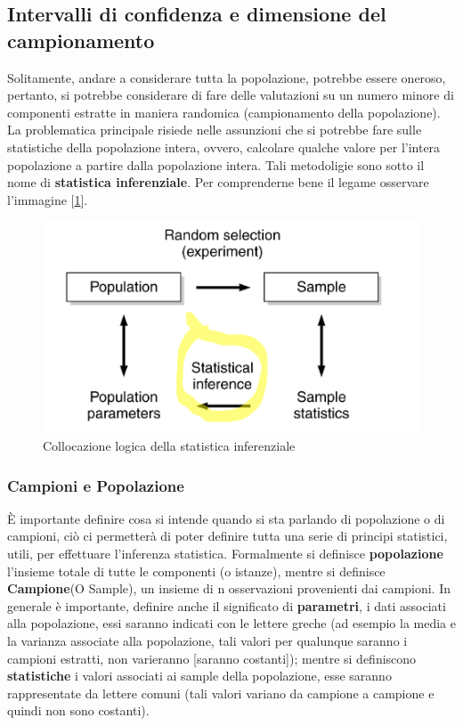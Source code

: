 \subsection{Intervalli di confidenza e dimensione del campionamento}
Solitamente, andare a considerare tutta la popolazione, potrebbe essere oneroso, pertanto, si potrebbe considerare di fare delle valutazioni su un numero minore di componenti estratte in maniera randomica (campionamento della popolazione). La problematica principale risiede nelle assunzioni che si potrebbe fare sulle statistiche della popolazione intera, ovvero, calcolare qualche valore per l'intera popolazione a partire dalla popolazione intera. Tali metodoligie sono sotto il nome di \textbf{statistica inferenziale}.
Per comprenderne bene il legame osservare l'immagine [\ref{img:statistica-inferenziale}].

\begin{figure}[h]
\centering
\includegraphics[width=.7\textwidth]{img/chapter-4/statistical-inference.png}
\caption{Collocazione logica della statistica inferenziale}\label{img:statistica-inferenziale}
\end{figure}

\subsubsection{Campioni e Popolazione}
\uppercase{è} importante definire cosa si intende quando si sta parlando di popolazione o di campioni, ciò ci permetterà di poter definire tutta una serie di principi statistici, utili, per effettuare l'inferenza statistica.
Formalmente si definisce \textbf{popolazione} l'insieme totale di tutte le componenti (o istanze), mentre si definisce \textbf{Campione}(O Sample), un insieme di n osservazioni provenienti dai campioni. In generale è importante, definire anche il significato di \textbf{parametri}, i dati associati alla popolazione, essi saranno indicati con le lettere greche (ad esempio la media e la varianza associate alla popolazione, tali valori per qualunque saranno i campioni estratti, non varieranno [saranno costanti]); mentre si definiscono \textbf{statistiche} i valori associati ai sample della popolazione, esse saranno rappresentate da lettere comuni (tali valori variano da campione a campione e quindi non sono costanti).

